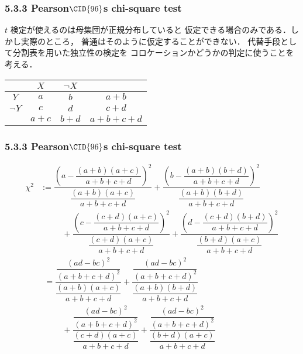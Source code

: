 \documentclass[10pt,leqno]{beamer}
\begin{document}
\begin{frame}
    \frametitle{5.3.3 Pearson$\CID{96}$s chi-square test}
    $t$ 検定が使えるのは母集団が正規分布していると
    仮定できる場合のみである．しかし実際のところ，
    普通はそのように仮定することができない．
    代替手段として分割表を用いた独立性の検定を
    コロケーションかどうかの判定に使うことを考える．

    \bigskip

    \begin{table}
        \begin{center}
            \begin{tabular}{|c|c|c|c|}
                \hline
                          & $X$     & $\lnot X$ &     \\
                \hline
                $Y$       & $a$     & $b$       & $a + b$\\
                \hline
                $\lnot Y$ & $c$     & $d$       & $c + d$\\
                \hline
                          & $a + c$ & $b + d$   & $a + b + c + d$ \\
                \hline
            \end{tabular}
        \end{center}
    \end{table}

\end{frame}

\begin{frame}
    \frametitle{5.3.3 Pearson$\CID{96}$s chi-square test}
    \begin{align*}
        \chi^2 &:= \dfrac{\left(a - \dfrac{(a + b)(a + c)}{a + b + c + d}\right)^2}{\dfrac{(a + b)(a + c)}{a + b + c + d}}
                   + \dfrac{\left(b - \dfrac{(a + b)(b + d)}{a + b + c + d}\right)^2}{\dfrac{(a + b)(b + d)}{a + b + c + d}}
                   \\
               &\phantom{==}+ \dfrac{\left(c - \dfrac{(c + d)(a + c)}{a + b + c + d}\right)^2}{\dfrac{(c + d)(a + c)}{a + b + c + d}}
                   + \dfrac{\left(d - \dfrac{(c + d)(b + d)}{a + b + c + d}\right)^2}{\dfrac{(b + d)(a + c)}{a + b + c + d}}\\
               &\phantom{:}= \dfrac{\dfrac{(ad - bc)^2}{(a + b + c + d)^2}}{\dfrac{(a + b)(a + c)}{a + b + c + d}}
                   + \dfrac{\dfrac{(ad - bc)^2}{(a + b + c + d)^2}}{\dfrac{(a + b)(b + d)}{a + b + c + d}} \\
               &\phantom{==}+ \dfrac{\dfrac{(ad - bc)^2}{(a + b + c + d)^2}}{\dfrac{(c + d)(a + c)}{a + b + c + d}}
                   + \dfrac{\dfrac{(ad - bc)^2}{(a + b + c + d)^2}}{\dfrac{(b + d)(a + c)}{a + b + c + d}}
    \end{align*}
\end{frame}
\end{document}
